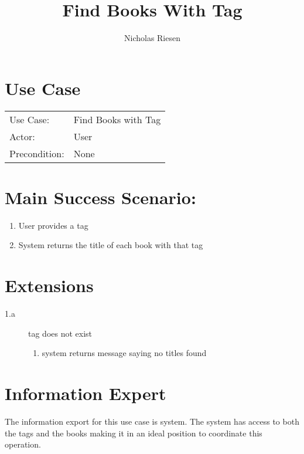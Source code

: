 \documentclass{article}
\title{Find Books With Tag}
\author{Nicholas Riesen}
\begin{document}
\maketitle

\section*{Use Case}
\begin{tabular}{l l}
 
Use Case:     & Find Books with Tag \\
Actor:        & User                \\
Precondition: & None                \\
\end{tabular}

\section*{Main Success Scenario:}
\begin{enumerate}
    \item User provides a tag
    \item System returns the title of each book with that tag
\end{enumerate}

\section*{Extensions}
\begin{description}
    \item[1.a] tag does not exist
    \begin{enumerate}
        \item system returns message saying no titles found
    \end{enumerate}
\end{description}

\section*{Information Expert}
The information export for this use case is system. The system has access to both the tags and the books making it in an ideal position to coordinate this operation. 
\end{document}
